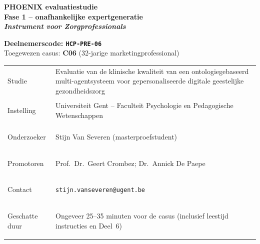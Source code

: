 \documentclass[11pt,a4paper]{article}
\renewcommand{\arraystretch}{1.28}
\begin{document}
\thispagestyle{fancy}
\vspace*{0.3cm}

\begin{tcolorbox}[
  colback=DarkBlue,colframe=DarkBlue,
  arc=3mm,left=14pt,right=14pt,top=12pt,bottom=12pt,
  width=\textwidth
]
\centering
{\fontsize{22}{28}\selectfont\bfseries\color{white}
PHOENIX evaluatiestudie\\[0.3em]
\fontsize{15}{20}\selectfont\color{AccentBlue}
Fase 1 -- onafhankelijke expertgeneratie\\[0.2em]
\fontsize{12}{16}\selectfont\color{white}
\textit{Instrument voor Zorgprofessionals}
}
\end{tcolorbox}

\vspace{0.6cm}

\begin{center}
\begin{tcolorbox}[
  colback=AccentBlue,colframe=PrimaryBlue,
  arc=2.5mm,boxrule=1.2pt,left=12pt,right=12pt,top=10pt,bottom=10pt,
  width=0.86\textwidth
]
\centering
{\large\bfseries\color{DarkBlue}Deelnemerscode: \texttt{HCP-PRE-06}}\\[0.5em]
{\normalsize\color{SlateMid}
Toegewezen casus:\quad
\textbf{\color{PrimaryBlue}C06} (32-jarige marketingprofessional)
}
\end{tcolorbox}
\end{center}

\vspace{0.5cm}

\begin{center}
\begin{tcolorbox}[
  colback=SoftBG,colframe=BorderGrey,
  arc=2mm,left=10pt,right=10pt,top=9pt,bottom=9pt,
  width=0.92\textwidth
]
\small\renewcommand{\arraystretch}{1.28}
\begin{tabularx}{\textwidth}{@{}>{\bfseries\raggedright\arraybackslash}p{}X@{}}
Studie & Evaluatie van de klinische kwaliteit van een ontologiegebaseerd multi-agentsysteem voor gepersonaliseerde digitale geestelijke gezondheidszorg \\
Instelling & Universiteit Gent -- Faculteit Psychologie en Pedagogische Wetenschappen \\
Onderzoeker & Stijn Van Severen (masterproefstudent) \\
Promotoren & Prof.\ Dr.\ Geert Crombez; Dr.\ Annick De Paepe \\
Contact & \texttt{stijn.vanseveren@ugent.be} \\
Geschatte duur & Ongeveer 25--35 minuten voor de casus (inclusief leestijd instructies en Deel~6) \\
\end{tabularx}
\end{tcolorbox}
\end{center}
\end{document}
